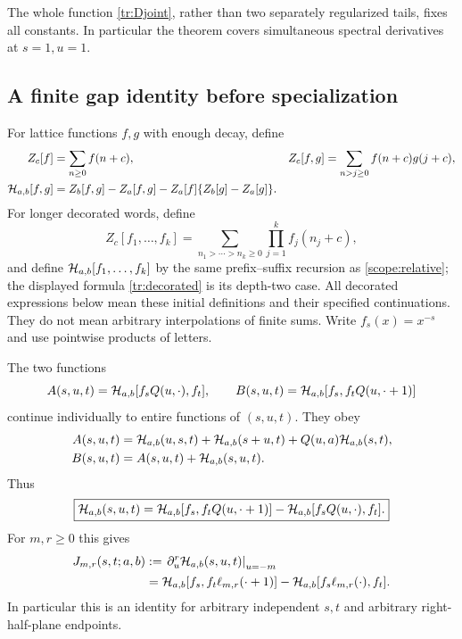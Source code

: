 The whole function \eqref{tr:Djoint}, rather than two separately
regularized tails, fixes all constants. In particular the theorem covers
simultaneous spectral derivatives at $s=1,u=1$.

\subsection{A finite gap identity before specialization}

For lattice functions $f,g$ with enough decay, define
\begin{align}
 Z_c[f]&=\sum_{n\geq0}f(n+c),&
 Z_c[f,g]&=\sum_{n>j\geq0}f(n+c)g(j+c),\notag\\
 \mathcal H_{a,b}[f,g]
   &=Z_b[f,g]-Z_a[f,g]-Z_a[f]\{Z_b[g]-Z_a[g]\}.
 \label{tr:decorated}
\end{align}
For longer decorated words, define
\[
 Z_c[f_1,\ldots,f_k]
   =\sum_{n_1>\cdots>n_k\geq0}\prod_{j=1}^k f_j(n_j+c),
\]
and define $\mathcal H_{a,b}[f_1,\ldots,f_k]$ by the same
prefix--suffix recursion as \eqref{scope:relative}; the displayed
formula \eqref{tr:decorated} is its depth-two case.
All decorated expressions below mean these initial definitions and their
specified continuations. They do not mean arbitrary interpolations of
finite sums. Write $f_s(x)=x^{-s}$ and use pointwise products of letters.

\begin{theorem}
\label{tr:gap}
The two functions
\[
 A(s,u,t)=\mathcal H_{a,b}[f_sQ(u,\cdot),f_t],\qquad
 B(s,u,t)=\mathcal H_{a,b}[f_s,f_tQ(u,\cdot+1)]
\]
continue individually to entire functions of $(s,u,t)$. They obey
\begin{align}
 A(s,u,t)
   &=\mathcal H_{a,b}(u,s,t)+\mathcal H_{a,b}(s+u,t)
                      +Q(u,a)\mathcal H_{a,b}(s,t),\label{tr:A}\\
 B(s,u,t)&=A(s,u,t)+\mathcal H_{a,b}(s,u,t).\label{tr:B}
\end{align}
Thus
\begin{equation}\label{tr:genericgap}
 \boxed{\mathcal H_{a,b}(s,u,t)
   =\mathcal H_{a,b}[f_s,f_tQ(u,\cdot+1)]
       -\mathcal H_{a,b}[f_sQ(u,\cdot),f_t].}
\end{equation}
For $m,r\geq0$ this gives
\begin{align}
 J_{m,r}(s,t;a,b)
 &:=\left.\partial_u^r\mathcal H_{a,b}(s,u,t)\right|_{u=-m}\notag\\
 &=\mathcal H_{a,b}[f_s,f_t\ell_{m,r}(\cdot+1)]
      -\mathcal H_{a,b}[f_s\ell_{m,r}(\cdot),f_t].
 \label{tr:J}
\end{align}
In particular this is an identity for arbitrary independent $s,t$ and
arbitrary right-half-plane endpoints.
\end{theorem}

